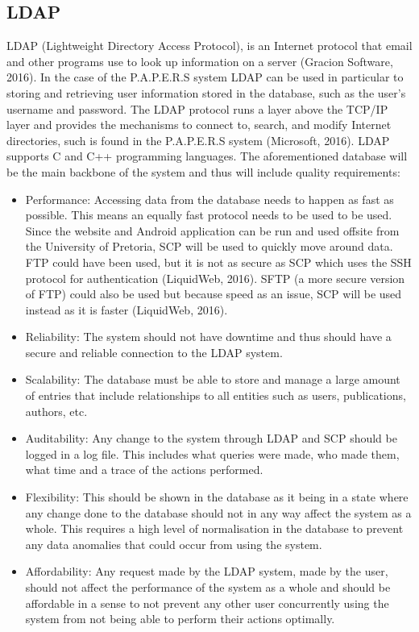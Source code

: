 \documentclass[12pt, letterpaper, twoside]{article}
\begin{document}
    \subsection{LDAP}
    LDAP (Lightweight Directory Access Protocol), is an Internet protocol that email and other programs use to look up information on a server (Gracion Software, 2016). In the case of the P.A.P.E.R.S system LDAP can be used in particular to storing and retrieving user information stored in the database, such as the user’s username and password. The LDAP protocol runs a layer above the TCP/IP layer and provides the mechanisms to connect to, search, and modify Internet directories, such is found in the P.A.P.E.R.S system (Microsoft, 2016). LDAP supports C and C++ programming languages. The aforementioned database will be the main backbone of the system and thus will include quality requirements:
    \begin{itemize}  

        \item Performance: Accessing data from the database needs to happen as fast as possible. This means an equally fast protocol needs to be used to be used. Since the website and Android application can be run and used offsite from the University of Pretoria, SCP will be used to quickly move around data. FTP could have been used, but it is not as secure as SCP which uses the SSH protocol for authentication (LiquidWeb, 2016). SFTP (a more secure version of FTP) could also be used but because speed as an issue, SCP will be used instead as it is faster (LiquidWeb, 2016).
        \item Reliability: The system should not have downtime and thus should have a secure and reliable connection to the LDAP system.
        \item Scalability: The database must be able to store and manage a large amount of entries that include relationships to all entities such as users, publications, authors, etc. 
        \item Auditability: Any change to the system through LDAP and SCP should be logged in a log file. This includes what queries were made, who made them, what time and a trace of the actions performed.
        \item Flexibility: This should be shown in the database as it being in a state where any change done to the database should not in any way affect the system as a whole. This requires a high level of normalisation in the database to prevent any data anomalies that could occur from using the system.
        \item Affordability: Any request made by the LDAP system, made by the user, should not affect the performance of the system as a whole and should be affordable in a sense to not prevent any other user concurrently using the system from not being able to perform their actions optimally.
    \end{itemize}
    \endsubsection{}
\end{document}
